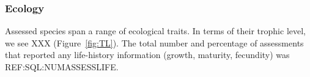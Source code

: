 \subsubsection*{Ecology}
Assessed species span a range of ecological traits. In terms of their
trophic level, we see XXX (Figure~\ref{fig:TL}). The total number and
percentage of assessments that reported any life-history information
(growth, maturity, fecundity) was REF:SQL:NUMASSESSLIFE.




